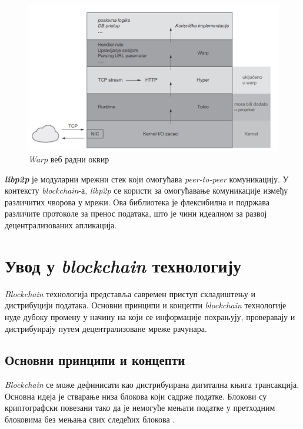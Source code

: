 \documentclass[12pt, a4paper]{article}
\begin{document}
\begin{figure}[h]
    \centering
    \includegraphics[width=1\linewidth]{slike/warp.png}
    \caption{\textit{Warp} веб радни оквир}
    \label{fig:2.1}
\end{figure}

\textit{\textbf{libp2p}} је модуларни мрежни стек који омогућава \textit{peer-to-peer} комуникацију. У контексту \textit{blockchain}-а, \textit{libp2p} се користи за омогућавање комуникације између различитих чворова у мрежи. Ова библиотека је флексибилна и подржава различите протоколе за пренос података, што је чини идеалном за развој децентрализованих апликација.

\pagebreak

\section{Увод у \textit{blockchain} технологију}
\textit{Blockchain} технологија представља савремен приступ складиштењу и дистрибуцији података. Основни принципи и концепти \textit{blockchain} технологије нуде дубоку промену у начину на који се информације похрањују, проверавају и дистрибуирају путем децентрализоване мреже рачунара.

\subsection{Основни принципи и концепти}
\textit{Blockchain} се може дефинисати као дистрибуирана дигитална књига трансакција. Основна идеја је стварање низа блокова који садрже податке. Блокови су криптографски повезани тако да је немогуће мењати податке у претходним блоковима без мењања свих следећих блокова \cite{8}. 
\end{document}
